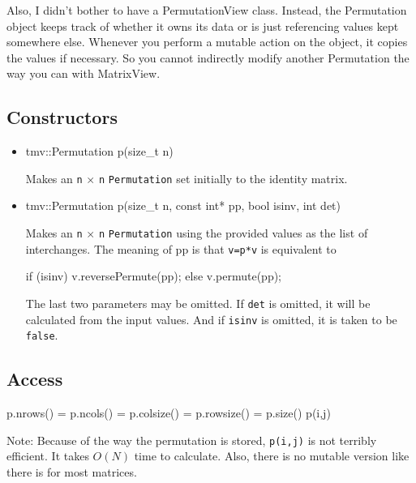 \documentclass[twoside,letterpaper,11pt]{article}
\renewcommand{\tt}[1]{{\lstinline {#1}}}
\begin{document}
Also, I didn't bother to have a PermutationView class.  Instead, the 
Permutation object keeps track of whether it owns its data or is just
referencing values kept somewhere else.  Whenever you perform 
a mutable action on the object, it copies the values if necessary.
So you cannot indirectly modify another Permutation the way you can
with MatrixView.

\subsection{Constructors}
\label{Permutation_Constructors}

\begin{itemize}
\item 
\begin{tmvcode}
tmv::Permutation p(size_t n)
\end{tmvcode}
Makes an \tt{n} $\times$ \tt{n} \tt{Permutation} set initially to the identity matrix.

\item
\begin{tmvcode}
tmv::Permutation p(size_t n, const int* pp, bool isinv, int det)
\end{tmvcode}
Makes an \tt{n} $\times$ \tt{n} \tt{Permutation} using the provided values as the 
list of interchanges.  The meaning of pp is that \tt{v=p*v} is equivalent to
\begin{tmvcode}
if (isinv) v.reversePermute(pp);
else v.permute(pp);
\end{tmvcode}
The last two parameters may be omitted.  If \tt{det} is omitted, it will be calculated
from the input values.  And if \tt{isinv} is omitted, it is taken to be \tt{false}.

\end{itemize}


\subsection{Access}
\label{Permutation_Access}

\begin{tmvcode}
p.nrows() = p.ncols() = p.colsize() = p.rowsize() = p.size()
p(i,j)
\end{tmvcode}
Note: Because of the way the permutation is stored, \tt{p(i,j)} is not
terribly efficient.  It takes $O(N)$ time to calculate.  Also, there is no
mutable version like there is for most matrices.
\end{document}
